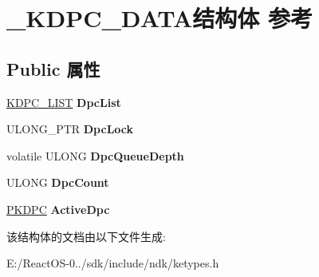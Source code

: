 \hypertarget{struct___k_d_p_c___d_a_t_a}{}\section{\+\_\+\+K\+D\+P\+C\+\_\+\+D\+A\+T\+A结构体 参考}
\label{struct___k_d_p_c___d_a_t_a}
\subsection*{Public 属性}
\begin{DoxyCompactItemize}
\item 
\mbox{\label{struct___k_d_p_c___d_a_t_a_ac6e3d40010a7fe06fb9f22c664a2c510}} 
\hyperlink{struct___k_d_p_c___l_i_s_t}{K\+D\+P\+C\+\_\+\+L\+I\+ST} {\bfseries Dpc\+List}
\item 
\mbox{\label{struct___k_d_p_c___d_a_t_a_a54fc95444529550e6c7f071ee71ba676}} 
U\+L\+O\+N\+G\+\_\+\+P\+TR {\bfseries Dpc\+Lock}
\item 
\mbox{\label{struct___k_d_p_c___d_a_t_a_a791e7870cd2a6667033ed832978b286d}} 
volatile U\+L\+O\+NG {\bfseries Dpc\+Queue\+Depth}
\item 
\mbox{\label{struct___k_d_p_c___d_a_t_a_a3fa4970da475efb74f65d874abf2b158}} 
U\+L\+O\+NG {\bfseries Dpc\+Count}
\item 
\mbox{\label{struct___k_d_p_c___d_a_t_a_a8e79057bd8ee336b6b6c899b3c71343c}} 
\hyperlink{struct___k_d_p_c}{P\+K\+D\+PC} {\bfseries Active\+Dpc}
\end{DoxyCompactItemize}


该结构体的文档由以下文件生成\+:\begin{DoxyCompactItemize}
\item 
E\+:/\+React\+O\+S-\/0../sdk/include/ndk/ketypes.\+h\end{DoxyCompactItemize}

